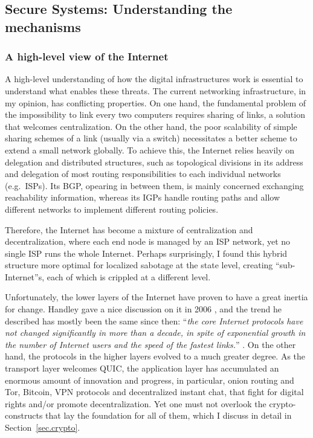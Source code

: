 \documentclass[10pt]{article}
\begin{document}
\subsection[Secure Systems]{
Secure Systems: Understanding the mechanisms} 
\label{sec.secure.systems}
\subsubsection{A high-level view of the Internet}
A high-level understanding of how the digital infrastructures work is essential
to understand what enables these threats. The current networking infrastructure,
in my opinion, has conflicting properties. On one hand, the fundamental problem
of the impossibility to link every two computers requires sharing of links, a
solution that welcomes centralization. On the other hand, the poor scalability
of simple sharing schemes of a link (usually via a switch) necessitates a
better scheme to extend a small network globally. To achieve this, the Internet
relies heavily on delegation and distributed structures, such as topological
divisions in its address and delegation of most routing responsibilities to
each individual networks (e.g.\ ISPs). Its BGP, opearing in between them, is
mainly concerned exchanging reachability information, whereas its IGPs handle
routing paths and allow different networks to implement different routing
policies.

Therefore, the Internet has become a mixture of centralization and
decentralization, where each end node is managed by an ISP network, yet no
single ISP runs the whole Internet. Perhaps surprisingly, I found this hybrid
structure more optimal for localized sabotage at the state level, creating
``sub-Internet''s, each of which is crippled at a different level. 

Unfortunately, the lower layers of the Internet have proven to have a great
inertia for change.  Handley gave a nice discussion on it in 2006
\cite{why.internet.just.works}, and the trend he described has mostly been the
same since then: ``\emph{the core Internet protocols have not changed
significantly in more than a decade, in spite of exponential growth in the
number of Internet users and the speed of the fastest links.}''
\cite{why.internet.just.works}. On the other hand, the protocols in the higher
layers evolved to a much greater degree. As the transport layer welcomes
QUIC\cite{quic}, the application layer has accumulated an enormous amount of
innovation and progress, in particular, onion routing and
Tor\cite{onion.routing, tor}, Bitcoin\cite{bitcoin}, VPN
protocols\cite{openvpn, wireguard} and decentralized instant chat\cite{matrix,
tox}, that fight for digital rights and/or promote decentralization. Yet one
must not overlook the crypto-constructs that lay the foundation for all of
them, which I discuss in detail in Section~\ref{sec.crypto}.
\end{document}
